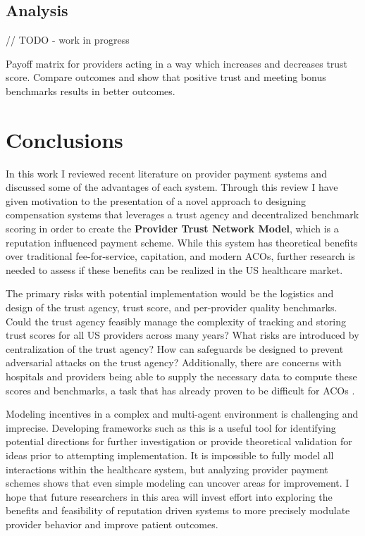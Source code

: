 \documentclass{article}
\begin{document}
\subsection{Analysis}
// TODO - work in progress

Payoff matrix for providers acting in a way which increases and decreases trust score. Compare outcomes and show that positive trust and meeting bonus benchmarks results in better outcomes.

\section{Conclusions}
In this work I reviewed recent literature on provider payment systems and discussed some of the advantages of each system. Through this review I have given motivation to the presentation of a novel approach to designing compensation systems that leverages a trust agency and decentralized benchmark scoring in order to create the \textbf{Provider Trust Network Model}, which is a reputation influenced payment scheme. While this system has theoretical benefits over traditional fee-for-service, capitation, and modern ACOs, further research is needed to assess if these benefits can be realized in the US healthcare market.

The primary risks with potential implementation would be the logistics and design of the trust agency, trust score, and per-provider quality benchmarks. Could the trust agency feasibly manage the complexity of tracking and storing trust scores for all US providers across many years? What risks are introduced by centralization of the trust agency? How can safeguards be designed to prevent adversarial attacks on the trust agency? Additionally, there are concerns with hospitals and providers being able to supply the necessary data to compute these scores and benchmarks, a task that has already proven to be difficult for ACOs \cite{acoecon}.

Modeling incentives in a complex and multi-agent environment is challenging and imprecise. Developing frameworks such as this is a useful tool for identifying potential directions for further investigation or provide theoretical validation for ideas prior to attempting implementation. It is impossible to fully model all interactions within the healthcare system, but analyzing provider payment schemes shows that even simple modeling can uncover areas for improvement. I hope that future researchers in this area will invest effort into exploring the benefits and feasibility of reputation driven systems to more precisely modulate provider behavior and improve patient outcomes.
\end{document}
